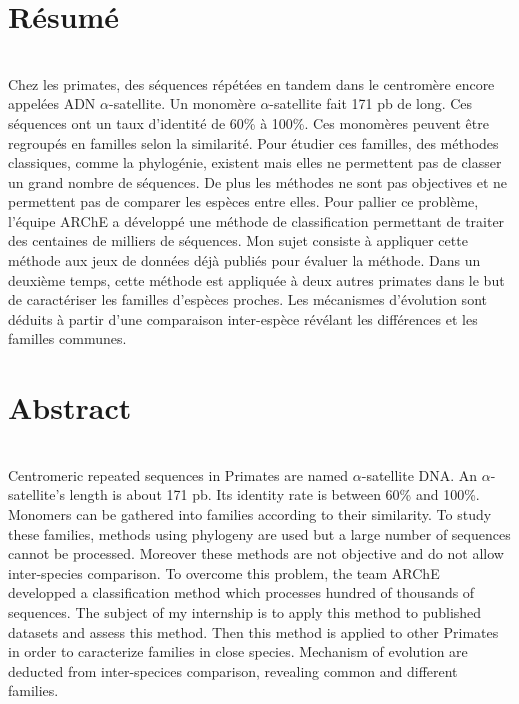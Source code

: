 \documentclass[12pt,a4paper]{article}
\begin{document}
\section*{Résumé}~\\[0.2cm]
Chez les primates, des séquences répétées en tandem dans le centromère  encore appelées ADN $\alpha$-satellite. Un monomère $\alpha$-satellite fait 171 pb de long. Ces séquences ont un taux d'identité de 60\% à 100\%. Ces monomères peuvent être regroupés en familles selon la similarité. Pour étudier ces familles, des méthodes classiques, comme la phylogénie, existent mais elles ne permettent pas de classer un grand nombre de séquences. De plus les méthodes ne sont pas objectives et ne permettent pas de comparer les espèces entre elles. Pour pallier ce problème, l'équipe ARChE a développé une méthode de classification permettant de traiter des centaines de milliers de séquences. Mon sujet consiste à appliquer cette méthode aux jeux de données déjà publiés pour évaluer la méthode. Dans un deuxième temps, cette méthode est appliquée à deux autres primates dans le but de  caractériser les familles d'espèces proches. Les mécanismes d'évolution sont déduits à partir d'une comparaison inter-espèce révélant les différences et les familles communes. 

\section*{Abstract}~\\[0.2cm]
Centromeric repeated sequences in Primates are named $\alpha$-satellite DNA. An $\alpha$-satellite's length is about 171 pb. Its identity rate is between 60\% and 100\%. Monomers can be gathered into families according to their similarity. To study these families, methods using phylogeny are used but a large number of sequences cannot be processed. Moreover these methods are not objective and do not allow inter-species comparison. To overcome this problem, the team ARChE developped a classification method which processes hundred of thousands of sequences. The subject of my internship is to apply this method to published datasets and assess this method. Then this method is applied to other Primates in order to caracterize families in close species. Mechanism of evolution are deducted from inter-specices comparison, revealing common and different families. 
\end{document}
